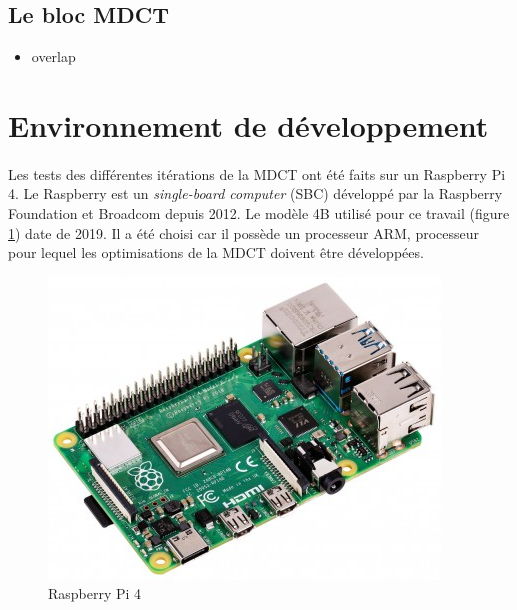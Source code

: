 \documentclass{article}
\begin{document}



    \subsection{Le bloc MDCT}

    \begin{itemize}
        \item overlap
    \end{itemize}



    \newpage
    \section{Environnement de développement}

    \paragraph{}
    Les tests des différentes itérations de la MDCT ont été faits sur un Raspberry Pi 4. Le Raspberry est un \emph{single-board computer} (SBC) développé par la Raspberry Foundation et Broadcom depuis 2012. Le modèle 4B utilisé pour ce travail (figure \ref{fig:raspberry}) date de 2019. Il a été choisi car il possède un processeur ARM, processeur pour lequel les optimisations de la MDCT doivent être développées\cite{raspberry-doc}.

    \begin{figure}[H]
        \centering
        \includegraphics[width=.55\linewidth]{./images/raspberry.png}
        \caption{Raspberry Pi 4}
        \label{fig:raspberry}
    \end{figure}
\end{document}
